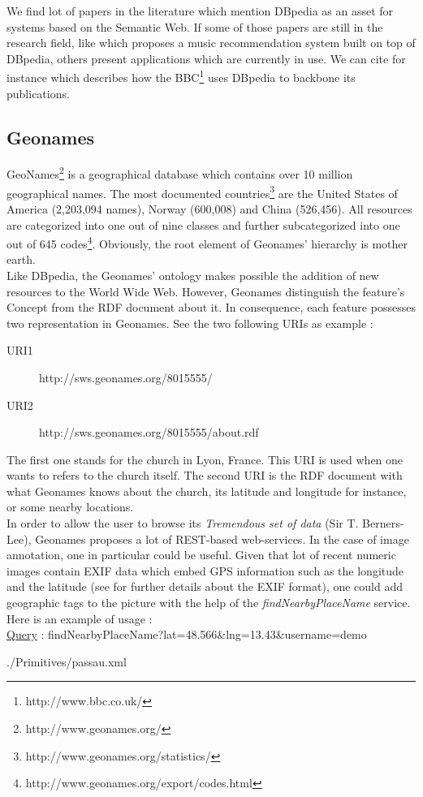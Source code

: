 We find lot of papers in the literature which mention DBpedia as an asset for systems based on the Semantic Web. If some of those papers are still in the research field, like \cite{passant2010dbrec} which proposes a music recommendation system built on top of DBpedia, others present  applications which are currently in use. We can cite for instance \cite{kobilarov2009media} which describes how the BBC\footnote{http://www.bbc.co.uk/} uses DBpedia to backbone its publications. 

\subsection{Geonames} %
\label{sub:geonames}

GeoNames\footnote{http://www.geonames.org/} is a geographical database which contains over 10 million geographical names. The most documented countries\footnote{http://www.geonames.org/statistics/} are the United States of America (2,203,094 names), Norway (600,008) and China (526,456). All resources are categorized into one out of nine classes and further subcategorized into one out of 645 codes\footnote{http://www.geonames.org/export/codes.html}. Obviously, the root element of Geonames' hierarchy is mother earth.\\

Like DBpedia, the Geonames' ontology makes possible the addition of new resources to the World Wide Web. However, Geonames distinguish the feature's Concept from the RDF document about it. In consequence, each feature possesses two representation in Geonames. See the two following URIs as example :
\begin{description}
\item[URI1] http://sws.geonames.org/8015555/
\item[URI2] http://sws.geonames.org/8015555/about.rdf
\end{description}
The first one stands for the  church in Lyon, France. This URI is used when one wants to refers to the church itself. The second URI is the RDF document with what Geonames knows about the church, its latitude and longitude for instance, or some nearby locations.\\

In order to allow the user to browse its \emph{Tremendous set of data} (Sir T. Berners-Lee), Geonames proposes a lot of REST-based web-services. In the case of image annotation, one in particular could be useful. Given that lot of recent numeric images contain EXIF data which embed GPS information such as the longitude and the latitude (see \cite{tevsic2005metadata} for further details about the EXIF format), one could add geographic tags to the picture with the help of the \textit{findNearbyPlaceName} service. Here is an example of usage :\\
\underline{Query} : findNearbyPlaceName?lat=48.566\&lng=13.43\&username=demo 

	{./Primitives/passau.xml}

